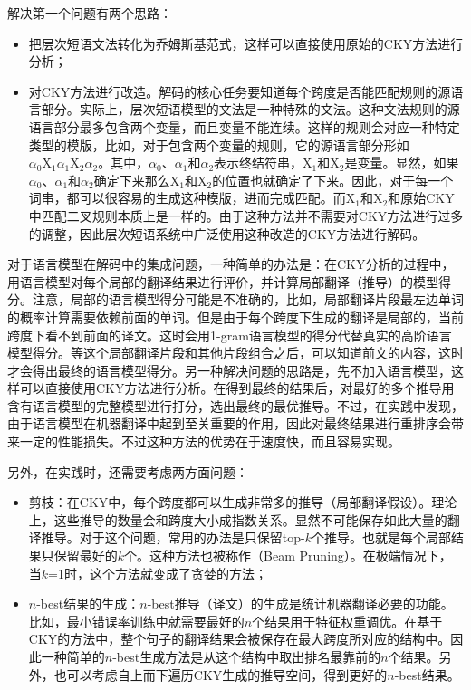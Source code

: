 \parinterval 解决第一个问题有两个思路：

\begin{itemize}
\vspace{0.5em}
\item 把层次短语文法转化为乔姆斯基范式，这样可以直接使用原始的CKY方法进行分析；
\vspace{0.5em}
\item 对CKY方法进行改造。解码的核心任务要知道每个跨度是否能匹配规则的源语言部分。实际上，层次短语模型的文法是一种特殊的文法。这种文法规则的源语言部分最多包含两个变量，而且变量不能连续。这样的规则会对应一种特定类型的模版，比如，对于包含两个变量的规则，它的源语言部分形如$\alpha_0 \textrm{X}_1 \alpha_1 \textrm{X}_2 \alpha_2$。其中，$\alpha_0$、$\alpha_1$和$\alpha_2$表示终结符串，$\textrm{X}_1$和$\textrm{X}_2$是变量。显然，如果$\alpha_0$、$\alpha_1$和$\alpha_2$确定下来那么$\textrm{X}_1$和$\textrm{X}_2$的位置也就确定了下来。因此，对于每一个词串，都可以很容易的生成这种模版，进而完成匹配。而$\textrm{X}_1$和$\textrm{X}_2$和原始CKY中匹配二叉规则本质上是一样的。由于这种方法并不需要对CKY方法进行过多的调整，因此层次短语系统中广泛使用这种改造的CKY方法进行解码。
\vspace{0.5em}
\end{itemize}

\parinterval 对于语言模型在解码中的集成问题，一种简单的办法是：在CKY分析的过程中，用语言模型对每个局部的翻译结果进行评价，并计算局部翻译（推导）的模型得分。注意，局部的语言模型得分可能是不准确的，比如，局部翻译片段最左边单词的概率计算需要依赖前面的单词。但是由于每个跨度下生成的翻译是局部的，当前跨度下看不到前面的译文。这时会用1-gram语言模型的得分代替真实的高阶语言模型得分。等这个局部翻译片段和其他片段组合之后，可以知道前文的内容，这时才会得出最终的语言模型得分。另一种解决问题的思路是，先不加入语言模型，这样可以直接使用CKY方法进行分析。在得到最终的结果后，对最好的多个推导用含有语言模型的完整模型进行打分，选出最终的最优推导。不过，在实践中发现，由于语言模型在机器翻译中起到至关重要的作用，因此对最终结果进行重排序会带来一定的性能损失。不过这种方法的优势在于速度快，而且容易实现。

\parinterval 另外，在实践时，还需要考虑两方面问题：

\begin{itemize}
\vspace{0.5em}
\item 剪枝：在CKY中，每个跨度都可以生成非常多的推导（局部翻译假设）。理论上，这些推导的数量会和跨度大小成指数关系。显然不可能保存如此大量的翻译推导。对于这个问题，常用的办法是只保留top-$k$个推导。也就是每个局部结果只保留最好的$k$个。这种方法也被称作{\small{}}（Beam Pruning）。在极端情况下，当$k$=1时，这个方法就变成了贪婪的方法；
\vspace{0.5em}
\item $n$-best结果的生成：$n$-best推导（译文）的生成是统计机器翻译必要的功能。比如，最小错误率训练中就需要最好的$n$个结果用于特征权重调优。在基于CKY的方法中，整个句子的翻译结果会被保存在最大跨度所对应的结构中。因此一种简单的$n$-best生成方法是从这个结构中取出排名最靠前的$n$个结果。另外，也可以考虑自上而下遍历CKY生成的推导空间，得到更好的$n$-best结果\cite{huang2005better}。
\end{itemize}

